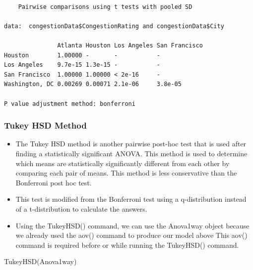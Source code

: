 \documentclass[
  letterpaper,
  DIV=11,
  numbers=noendperiod]{scrreprt}
\newenvironment{Shaded}{\begin{snugshade}}{\end{snugshade}}
\newcommand{\AttributeTok}[1]{\textcolor[rgb]{0.40,0.45,0.13}{#1}}
\newcommand{\FunctionTok}[1]{\textcolor[rgb]{0.28,0.35,0.67}{#1}}
\newcommand{\NormalTok}[1]{\textcolor[rgb]{0.00,0.23,0.31}{#1}}
\newcommand{\SpecialCharTok}[1]{\textcolor[rgb]{0.37,0.37,0.37}{#1}}
\newcommand{\StringTok}[1]{\textcolor[rgb]{0.13,0.47,0.30}{#1}}
\providecommand{\tightlist}{%
  \setlength{\itemsep}{0pt}\setlength{\parskip}{0pt}}\usepackage{longtable,booktabs,array}
\begin{document}
\begin{Shaded}
\end{Shaded}

\begin{verbatim}

    Pairwise comparisons using t tests with pooled SD 

data:  congestionData$CongestionRating and congestionData$City 

               Atlanta Houston Los Angeles San Francisco
Houston        1.00000 -       -           -            
Los Angeles    9.7e-15 1.3e-15 -           -            
San Francisco  1.00000 1.00000 < 2e-16     -            
Washington, DC 0.00269 0.00071 2.1e-06     3.8e-05      

P value adjustment method: bonferroni 
\end{verbatim}

\subsubsection{Tukey HSD Method}\label{tukey-hsd-method}

\begin{itemize}
\tightlist
\item
  The Tukey HSD method is another pairwise post-hoc test that is used
  after finding a statistically significant ANOVA. This method is used
  to determine which means are statistically significantly different
  from each other by comparing each pair of means. This method is less
  conservative than the Bonferroni post hoc test.
\item
  This test is modified from the Bonferroni test using a q-distribution
  instead of a t-distribution to calculate the answers.
\item
  Using the TukeyHSD() command, we can use the Anova1way object because
  we already used the aov() command to produce our model above This
  aov() command is required before or while running the TukeyHSD()
  command.
\end{itemize}

\begin{Shaded}
\begin{Highlighting}[]
\FunctionTok{TukeyHSD}\NormalTok{(Anova1way)}
\end{Highlighting}
\end{Shaded}
\end{document}
